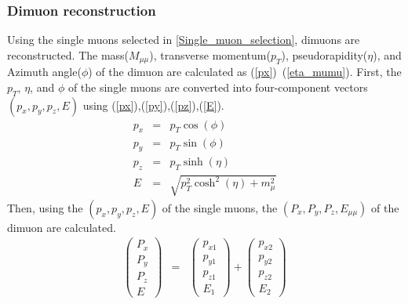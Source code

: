             \subsubsection{Dimuon reconstruction}
            \label{Dimuon_reco}
                Using the single muons selected in \ref{Single_muon_selection}, dimuons are reconstructed. The mass($M_{\mu\mu}$), transverse momentum($p_T$), pseudorapidity($\eta$), and Azimuth angle($\phi$) of the dimuon are calculated as (\ref{px})~(\ref{eta_mumu}). First, the $p_T$, $\eta$, and $\phi$ of the single muons are converted into four-component vectors $(p_x, p_y, p_z, E)$ using (\ref{px}),(\ref{py}),(\ref{pz}),(\ref{E}).\@
                \begin{eqnarray}
                    p_x &=& p_T \cos(\phi)\\ \label{px}
                    p_y &=& p_T \sin (\phi)\\ \label{py}
                    p_z &=& p_T \sinh (\eta)\\ \label{pz}
                    E &=& \sqrt{p_T^2 \cosh^2(\eta) + m_\mu^2} \label{E} 
                \end{eqnarray}
                Then, using the $(p_x, p_y, p_z, E)$ of the single muons, the $(P_x, P_y, P_z, E_{\mu\mu})$ of the dimuon are calculated.
                \begin{eqnarray}
                    \begin{pmatrix}
                        P_x \\
                        P_y \\
                        P_z \\
                        E
                    \end{pmatrix}
                    &=&
                    \begin{pmatrix}
                        p_{x1} \\
                        p_{y1} \\
                        p_{z1} \\
                        E_1
                    \end{pmatrix}
                    +
                    \begin{pmatrix}
                        p_{x2} \\
                        p_{y2} \\
                        p_{z2} \\
                        E_2
                    \end{pmatrix}
                \end{eqnarray}
